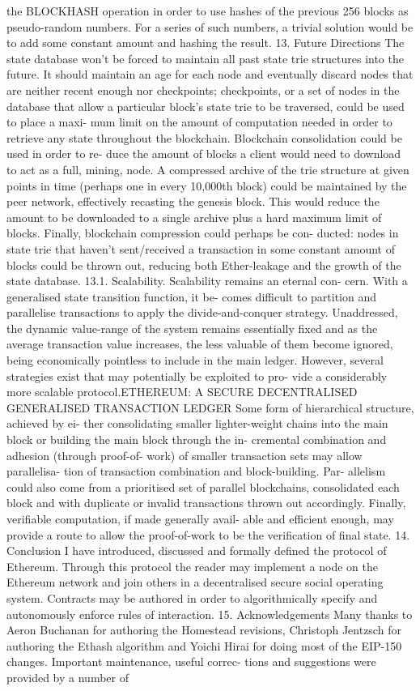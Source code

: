 \documentclass[10pt,a4paper,leqno,bibliography=totoc]{scrartcl}
\newenvironment{alphafootnotes}
{\par\edef\savedfootnotenumber{\number\value{footnote}}
\renewcommand{\thefootnote}{\alph{footnote}}
\setcounter{footnote}{0}}
{\par\setcounter{footnote}{\savedfootnotenumber}}
\begin{document}
\begin{alphafootnotes}
\begin{multicols*}{2}
the BLOCKHASH operation in order to use hashes of the previous 256 blocks as pseudo-random numbers. For a series of such numbers, a trivial solution would be to add some constant amount and hashing the result. 13. Future Directions The state database won’t be forced to maintain all past state trie structures into the future. It should maintain an age for each node and eventually discard nodes that are neither recent enough nor checkpoints; checkpoints, or a set of nodes in the database that allow a particular block’s state trie to be traversed, could be used to place a maxi- mum limit on the amount of computation needed in order to retrieve any state throughout the blockchain. Blockchain consolidation could be used in order to re- duce the amount of blocks a client would need to download to act as a full, mining, node. A compressed archive of the trie structure at given points in time (perhaps one in every 10,000th block) could be maintained by the peer network, effectively recasting the genesis block. This would reduce the amount to be downloaded to a single archive plus a hard maximum limit of blocks. Finally, blockchain compression could perhaps be con- ducted: nodes in state trie that haven’t sent/received a transaction in some constant amount of blocks could be thrown out, reducing both Ether-leakage and the growth of the state database. 13.1. Scalability. Scalability remains an eternal con- cern. With a generalised state transition function, it be- comes difficult to partition and parallelise transactions to apply the divide-and-conquer strategy. Unaddressed, the dynamic value-range of the system remains essentially fixed and as the average transaction value increases, the less valuable of them become ignored, being economically pointless to include in the main ledger. However, several strategies exist that may potentially be exploited to pro- vide a considerably more scalable protocol.ETHEREUM: A SECURE DECENTRALISED GENERALISED TRANSACTION LEDGER Some form of hierarchical structure, achieved by ei- ther consolidating smaller lighter-weight chains into the main block or building the main block through the in- cremental combination and adhesion (through proof-of- work) of smaller transaction sets may allow parallelisa- tion of transaction combination and block-building. Par- allelism could also come from a prioritised set of parallel blockchains, consolidated each block and with duplicate or invalid transactions thrown out accordingly. Finally, verifiable computation, if made generally avail- able and efficient enough, may provide a route to allow the proof-of-work to be the verification of final state. 14. Conclusion I have introduced, discussed and formally defined the protocol of Ethereum. Through this protocol the reader may implement a node on the Ethereum network and join others in a decentralised secure social operating system. Contracts may be authored in order to algorithmically specify and autonomously enforce rules of interaction. 15. Acknowledgements Many thanks to Aeron Buchanan for authoring the Homestead revisions, Christoph Jentzsch for authoring the Ethash algorithm and Yoichi Hirai for doing most of the EIP-150 changes. Important maintenance, useful correc- tions and suggestions were provided by a number of 
\end{multicols*}
\end{alphafootnotes}
\end{document}
